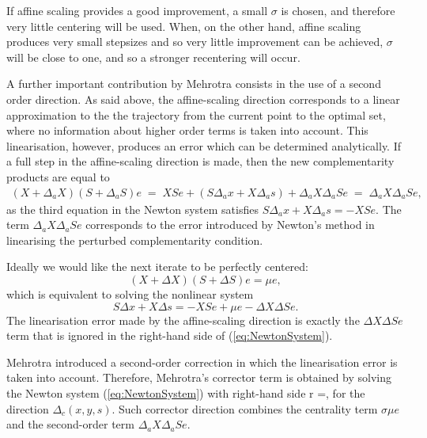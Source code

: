 
If affine scaling provides a good improvement, a small $\sigma$ 
is chosen, and therefore very little centering will be used. When, 
on the other hand, affine scaling produces very small stepsizes 
and so very little improvement can be achieved, $\sigma$ will be 
close to one, and so a stronger recentering will occur.


A further important contribution by Mehrotra consists in the 
use of a second order direction. As said above, the affine-scaling direction 
corresponds to a linear approximation to the the trajectory from 
the current point to the optimal set, where no information about 
higher order terms is taken into account. This linearisation, 
however, produces an error which can be determined analytically.
%
If a full step in the affine-scaling direction is made, then 
the new complementarity products are equal to
%
\begin{eqnarray*}
  (X + \Delta_a X) (S + \Delta_a S) e 
   \;=\; XSe + (S \Delta_a x + X \Delta_a s) + \Delta_a X \Delta_a S e
   \;=\; \Delta_a X \Delta_a S e,
\end{eqnarray*}
%
as the third equation in the Newton system satisfies 
$S \Delta_a x + X \Delta_a s = -XSe.$
%
The term $\Delta_a X \Delta_a S e$ corresponds to the error introduced
by Newton's method in linearising the perturbed complementarity condition.

Ideally we would like the next iterate to be perfectly centered: 
\[
  (X+\Delta X)(S+\Delta S)e=\mu e,
\]
which is equivalent to solving the nonlinear system
\[
  S\Delta x + X\Delta s = -XSe +\mu e - \Delta X\Delta Se.
\]
The linearisation error made by the affine-scaling direction is exactly 
the $\Delta X\Delta Se$ term that is ignored in the right-hand side
of (\ref{eq:NewtonSystem}).

Mehrotra introduced a second-order correction in which the 
linearisation error is taken into account. Therefore, 
Mehrotra's corrector term is obtained by solving the Newton system 
(\ref{eq:NewtonSystem}) with right-hand side
\be \label{eq:MehrotraRhs}
r =,
\ee
for the direction $\Delta_c (x,y,s)$.
Such corrector direction combines the centrality term $\sigma \mu e$
and the second-order term $\Delta_a X\Delta_a Se$.

